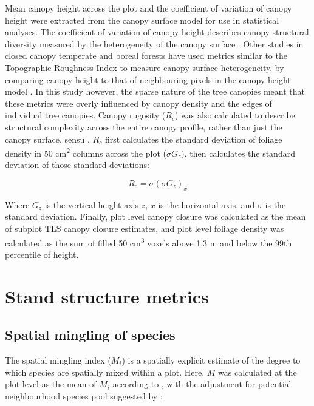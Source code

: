 \documentclass[11pt,a4paper]{article}
\begin{document}
Mean canopy height across the plot and the coefficient of variation of canopy height were extracted from the canopy surface model for use in statistical analyses. The coefficient of variation of canopy height describes canopy structural diversity measured by the heterogeneity of the canopy surface \citep{Parker2004}. Other studies in closed canopy temperate and boreal forests have used metrics similar to the Topographic Roughness Index to measure canopy surface heterogeneity, by comparing canopy height to that of neighbouring pixels in the canopy height model \citep{Weligepolage2012, HerreroHuerta2020}. In this study however, the sparse nature of the tree canopies meant that these metrics were overly influenced by canopy density and the edges of individual tree canopies. Canopy rugosity ($R_{c}$) was also calculated to describe structural complexity across the entire canopy profile, rather than just the canopy surface, sensu \citet{Hardiman2011}. $R_{c}$ first calculates the standard deviation of foliage density in 50 cm\textsuperscript{2} columns across the plot ($\sigma{}G_{z}$), then calculates the standard deviation of those standard deviations: 

\begin{equation}
	R_{c} = \sigma{}(\sigma{}G_{z})_{x}
\end{equation}

Where $G_{z}$ is the vertical height axis $z$, $x$ is the horizontal axis, and $\sigma{}$ is the standard deviation. Finally, plot level canopy closure was calculated as the mean of subplot TLS canopy closure estimates, and plot level foliage density was calculated as the sum of filled 50 cm\textsuperscript{3} voxels above 1.3 m and below the 99th percentile of height.

\section{Stand structure metrics}

\subsection{Spatial mingling of species}

The spatial mingling index ($M_{i}$) is a spatially explicit estimate of the degree to which species are spatially mixed within a plot. Here, $M$ was calculated at the plot level as the mean of $M_{i}$ according to \citet{Gadow2002}, with the adjustment for potential neighbourhood species pool suggested by \citet{Hui2011}: 
\end{document}
